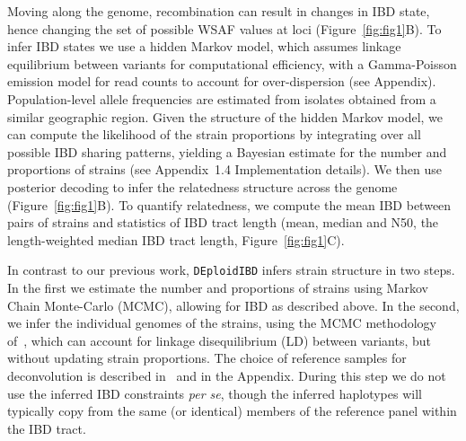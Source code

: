 \documentclass[9pt,lineno]{elife}
\begin{document}
Moving along the genome, recombination can result in changes in IBD state, hence changing the set of possible WSAF values at loci (Figure~\ref{fig:fig1}B).  To infer IBD states we use a hidden Markov model, which assumes linkage equilibrium between variants for computational efficiency, with a Gamma-Poisson emission model for read counts to account for over-dispersion (see Appendix).  Population-level allele frequencies are estimated from isolates obtained from a similar geographic region.  Given the structure of the hidden Markov model, we can compute the likelihood of the strain proportions by integrating over all possible IBD sharing patterns, yielding a Bayesian estimate for the number and proportions of strains (see Appendix~1.4 Implementation details).  We then use posterior decoding to infer the relatedness structure across the genome (Figure~\ref{fig:fig1}B). To quantify relatedness, we compute the mean IBD between pairs of strains and statistics of IBD tract length (mean, median and N50, the length-weighted median IBD tract length, Figure~\ref{fig:fig1}C).

In contrast to our previous work, \texttt{DEploidIBD} infers strain structure in two steps.  In the first we estimate the number and proportions of strains using Markov Chain Monte-Carlo (MCMC), allowing for IBD as described above.  In the second, we infer the individual genomes of the strains, using the MCMC methodology of~\citet{Zhu2017}, which can account for linkage disequilibrium (LD) between variants, but without updating strain proportions.  The choice of reference samples for deconvolution is described in~\citet{Zhu2017} and in the Appendix.  During this step we do not use the inferred IBD constraints {\em per se}, though the inferred haplotypes will typically copy from the same (or identical) members of the reference panel within the IBD tract.
\end{document}
